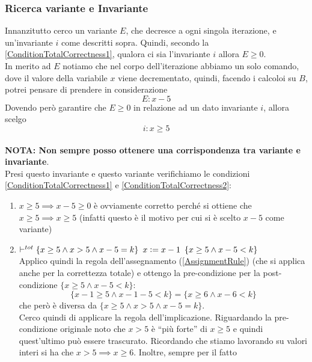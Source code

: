 \begin{esempio}
				      					\subsubsection{Ricerca variante e Invariante}
				      					Innanzitutto cerco un variante $E$, che decresce a ogni singola iterazione, e
				      					un'invariante $i$ come descritti sopra. Quindi, secondo la \ref{ConditionTotalCorrectness1}, qualora ci sia
				      					l'invariante $i$ allora  $E\geq 0$.\\
				      					In merito ad $E$ notiamo che nel corpo dell'iterazione abbiamo un solo	comando, dove il valore della variabile $x$ viene decrementato, quindi, facendo i calcoloi su $B$, potrei pensare di prendere in considerazione 
				      					\[E: x - 5\]
				      					Dovendo però garantire che $E\geq 0$ in relazione ad un dato invariante $i$, allora scelgo
				      					\[i: x \geq 5\] \\		\textbf{NOTA: Non sempre posso ottenere una corrispondenza tra variante e
				      						invariante}.\\
				      					Presi questo invariante e questo variante verifichiamo le condizioni \ref{ConditionTotalCorrectness1} e \ref{ConditionTotalCorrectness2}:
				      					\begin{enumerate}
				      						\item $x\geq 5\implies x-5\geq 0$ è ovviamente corretto perché si ottiene
				      						      che $x\geq 5\implies x \geq 5$ (infatti questo è il motivo per cui si è
				      						      scelto $x-5$ come variante)
				      						\item $\vdash^{tot}\{x\geq 5\land x>5\land x-5=k\}\,\,\,x\cceq
				      						      x-1\,\,\,\{x\geq 5\land x-5<k\}$\\
				      						      Applico quindi la regola dell'assegnamento (\ref{AssignmentRule}) (che si applica anche per la
				      						      correttezza totale) e ottengo la pre-condizione per la post-condizione
				      						      $\{x\geq 5\land x-5<k\}$:
				      						      \[\{x-1\geq 5\land x-1-5<k\}=\{x\geq 6\land x-6 < k\}\]
				      						      che però è diversa da $\{x\geq 5\land x>5\land x-5=k\}$.\\
				      						      Cerco quindi di applicare la regola dell'implicazione. Riguardando la
				      						      pre-condizione originale noto che $x>5$ è ``più forte'' di $x\geq 5$ e quindi
				      						      quest'ultimo può essere trascurato. Ricordando che stiamo lavorando su
				      						      valori interi si ha che $x>5\implies x\geq 6$. Inoltre, sempre per il fatto

\end{enumerate}
\end{esempio}
